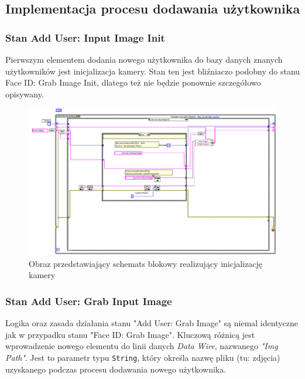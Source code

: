 \documentclass{report}
\begin{document}

\subsection{\Large Implementacja procesu dodawania użytkownika}

\subsubsection{\large Stan Add User: Input Image Init}

Pierwszym elementem dodania nowego użytkownika do bazy danych znanych użytkowników jest inicjalizacja kamery. Stan ten jest bliźniaczo podobny do stanu Face ID: Grab Image Init, dlatego też nie będzie ponownie szczegółowo opisywany. 

\begin{figure}
    \centering
    \includegraphics*[width=1.0\textwidth]{src/add-user/add-user-init.png}
    \caption{Obraz przedstawiający schemats blokowy realizujący inicjalizację kamery}
    \label{fig:add-user-init}
\end{figure}

\subsubsection{\large Stan Add User: Grab Input Image}

Logika oraz zasada działania stanu "Add User: Grab Image" są niemal identyczne jak w przypadku stanu "Face ID: Grab Image". Kluczową różnicą jest wprowadzenie nowego elementu do linii danych \textit{Data Wire}, nazwanego \textit{"Img Path"}. Jest to parametr typu \texttt{String}, który określa nazwę pliku (tu: zdjęcia) uzyskanego podczas procesu dodawania nowego użytkownika.
\end{document}
